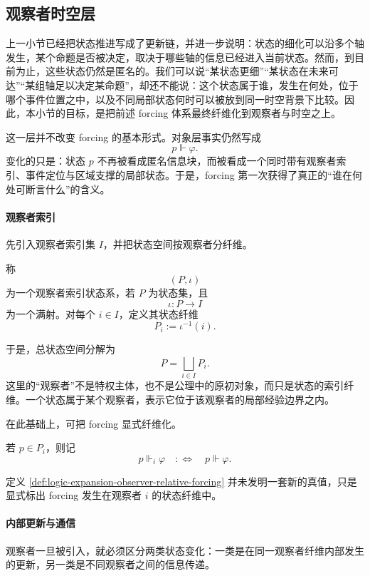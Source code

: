 \subsection{观察者时空层}\label{subsec:logic-expansion-chain-observer-spacetime}

上一小节已经把状态推进写成了更新链，并进一步说明：状态的细化可以沿多个轴发生，某个命题是否被决定，取决于哪些轴的信息已经进入当前状态。然而，到目前为止，这些状态仍然是匿名的。我们可以说“某状态更细”“某状态在未来可达”“某组轴足以决定某命题”，却还不能说：这个状态属于谁，发生在何处，位于哪个事件位置之中，以及不同局部状态何时可以被放到同一时空背景下比较。因此，本小节的目标，是把前述 forcing 体系最终纤维化到观察者与时空之上。

这一层并不改变 forcing 的基本形式。对象层事实仍然写成
\[
p\Vdash \varphi.
\]
变化的只是：状态 \(p\) 不再被看成匿名信息块，而被看成一个同时带有观察者索引、事件定位与区域支撑的局部状态。于是，forcing 第一次获得了真正的“谁在何处可断言什么”的含义。

\paragraph{观察者索引}
先引入观察者索引集 \(I\)，并把状态空间按观察者分纤维。

\begin{definition}[观察者索引状态系]\label{def:logic-expansion-observer-indexed-state-system}
称
\[
(P,\iota)
\]
为一个观察者索引状态系，若 \(P\) 为状态集，且
\[
\iota:P\to I
\]
为一个满射。对每个 \(i\in I\)，定义其状态纤维
\[
P_i:=\iota^{-1}(i).
\]
\end{definition}

于是，总状态空间分解为
\[
P=\bigsqcup_{i\in I}P_i.
\]
这里的“观察者”不是特权主体，也不是公理中的原初对象，而只是状态的索引纤维。一个状态属于某个观察者，表示它位于该观察者的局部经验边界之内。

在此基础上，可把 forcing 显式纤维化。

\begin{definition}\label{def:logic-expansion-observer-relative-forcing}
若 \(p\in P_i\)，则记
\[
p\Vdash_i \varphi
\quad:\Longleftrightarrow\quad
p\Vdash \varphi.
\]
\end{definition}

定义 \ref{def:logic-expansion-observer-relative-forcing} 并未发明一套新的真值，只是显式标出 forcing 发生在观察者 \(i\) 的状态纤维中。

\paragraph{内部更新与通信}
观察者一旦被引入，就必须区分两类状态变化：一类是在同一观察者纤维内部发生的更新，另一类是不同观察者之间的信息传递。

